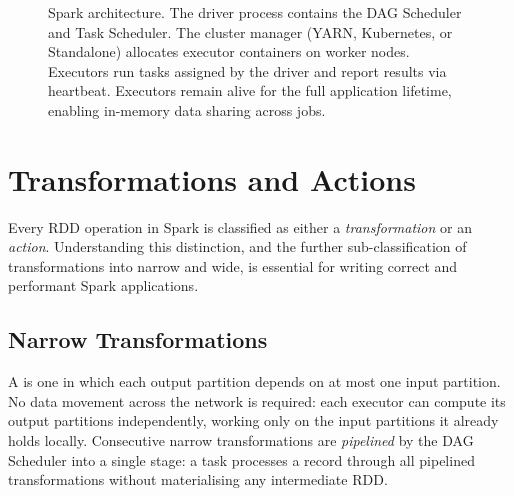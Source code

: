 \begin{figure}[h!t]
\caption{Spark architecture. The driver process contains the DAG Scheduler
         and Task Scheduler. The cluster manager (YARN, Kubernetes, or Standalone)
         allocates executor containers on worker nodes. Executors run tasks assigned
         by the driver and report results via heartbeat. Executors remain alive for
         the full application lifetime, enabling in-memory data sharing across jobs.}
\label{fig:spark-arch}
\end{figure}

\section{Transformations and Actions}
\label{sec:transformations}

Every RDD operation in Spark is classified as either a \emph{transformation}
or an \emph{action}. Understanding this distinction, and the further
sub-classification of transformations into narrow and wide, is essential
for writing correct and performant Spark applications.

\subsection{Narrow Transformations}
\label{subsec:narrow}

A  is one in which each output partition
depends on at most one input partition. No data movement across the
network is required: each executor can compute its output partitions
independently, working only on the input partitions it already holds
locally. Consecutive narrow transformations are \emph{pipelined} by the
DAG Scheduler into a single stage: a task processes a record through all
pipelined transformations without materialising any intermediate RDD.

